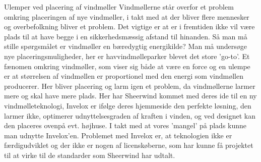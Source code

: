 Ulemper ved placering af vindmøller
Vindmøllerne står overfor et problem omkring placeringen af nye vindmøller, i takt med at der bliver flere mennesker og overbefolkning bliver et problem. Det vigtige er at er i fremtiden ikke vil være plads til at have begge i en sikkerhedsmæssig afstand til hinanden. Så man må stille spørgsmålet er vindmøller en bæredygtig energikilde? Man må undersøge nye placeringsmuligheder, her er havvindmølleparker blevet det store ’go-to’. Et fænomen omkring vindmøller, som viser sig både at være en force og en ulempe er at størrelsen af vindmøllen er proportionel med den energi som vindmøllen producerer. Her bliver placering og larm igen et problem, da vindmøllerne larmer mere og skal have mere plads. Her har Sheerwind kommet med deres ide til en ny vindmølleteknologi, Invelox er ifølge deres hjemmeside den perfekte løsning, den larmer ikke, optimerer udnyttelsesgraden af kraften i vinden, og ved designet kan den placeres ovenpå evt. højhuse. I takt med at vores ’mangel’ på plads kunne man udnytte Invelox’en. Problemet med Invelox er, at teknologien ikke er færdigudviklet og der ikke er nogen af licenskøberne, som har kunne få projektet til at virke til de standarder som Sheerwind har udtalt.